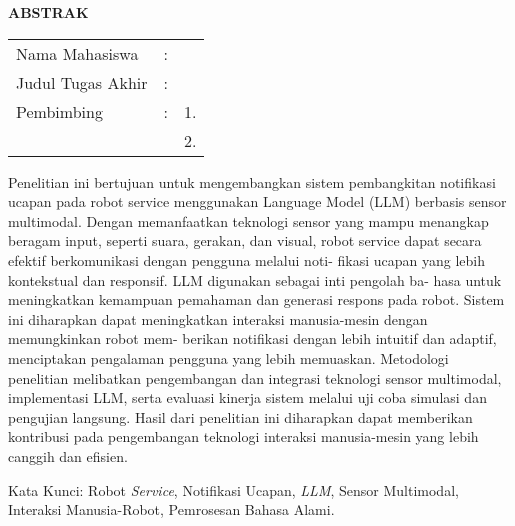 \begin{center}
  \large\textbf{ABSTRAK}
\end{center}


\vspace{2ex}

\begingroup
\setlength{\tabcolsep}{0pt}

\noindent
\begin{tabularx}{\textwidth}{l >{\centering}m{2em} X}
  Nama Mahasiswa    & : & \name{}         \\

  Judul Tugas Akhir & : & \tatitle{}      \\

  Pembimbing        & : & 1. \advisor{}   \\
                    &   & 2. \coadvisor{} \\
\end{tabularx}
\endgroup

Penelitian ini bertujuan untuk mengembangkan sistem pembangkitan notifikasi ucapan
pada robot service menggunakan Language Model (LLM) berbasis sensor multimodal. Dengan
memanfaatkan teknologi sensor yang mampu menangkap beragam input, seperti suara, gerakan,
dan visual, robot service dapat secara efektif berkomunikasi dengan pengguna melalui noti-
fikasi ucapan yang lebih kontekstual dan responsif. LLM digunakan sebagai inti pengolah ba-
hasa untuk meningkatkan kemampuan pemahaman dan generasi respons pada robot. Sistem ini
diharapkan dapat meningkatkan interaksi manusia-mesin dengan memungkinkan robot mem-
berikan notifikasi dengan lebih intuitif dan adaptif, menciptakan pengalaman pengguna yang
lebih memuaskan. Metodologi penelitian melibatkan pengembangan dan integrasi teknologi
sensor multimodal, implementasi LLM, serta evaluasi kinerja sistem melalui uji coba simulasi
dan pengujian langsung. Hasil dari penelitian ini diharapkan dapat memberikan kontribusi pada
pengembangan teknologi interaksi manusia-mesin yang lebih canggih dan efisien.

Kata Kunci: Robot \emph{Service}, Notifikasi Ucapan, \emph{LLM}, Sensor Multimodal, Interaksi Manusia-Robot, Pemrosesan Bahasa Alami.
